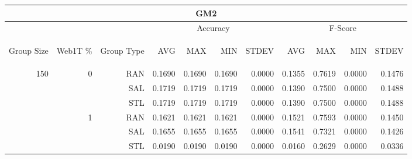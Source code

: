 \begin{center}
\begin{table}[htbp]
\begin{tabular}{ | r | r | r | r | r | r | r | r | r | r | r |}
\hline
\multicolumn{11}{|c|}{GM2}\\
\hline
 & & & \multicolumn{4}{|c|}{Accuracy} & \multicolumn{4}{|c|}{F-Score}\\ \cline{4-11}
\begin{sideways}Group Size\end{sideways} & \begin{sideways}Web1T \%\end{sideways} & \begin{sideways}Group Type\end{sideways} & \begin{sideways}AVG\end{sideways} & \begin{sideways}MAX\end{sideways} & \begin{sideways}MIN\end{sideways} & \begin{sideways}STDEV\end{sideways} & \begin{sideways}AVG\end{sideways} & \begin{sideways}MAX\end{sideways} & \begin{sideways}MIN\end{sideways} & \begin{sideways}STDEV\end{sideways}\\
\hline
\multirow{18}{*}{150}
 & \multirow{3}{*}{0} & RAN & 0.1690 & 0.1690 & 0.1690 & 0.0000 & 0.1355 & 0.7619 & 0.0000 & 0.1476\\ \cline{3-11}
 &   & SAL & 0.1719 & 0.1719 & 0.1719 & 0.0000 & 0.1390 & 0.7500 & 0.0000 & 0.1488\\ \cline{3-11}
 &   & STL & 0.1719 & 0.1719 & 0.1719 & 0.0000 & 0.1390 & 0.7500 & 0.0000 & 0.1488\\ \cline{2-11}
 & \multirow{3}{*}{1} & RAN & 0.1621 & 0.1621 & 0.1621 & 0.0000 & 0.1521 & 0.7593 & 0.0000 & 0.1450\\ \cline{3-11}
 &   & SAL & 0.1655 & 0.1655 & 0.1655 & 0.0000 & 0.1541 & 0.7321 & 0.0000 & 0.1426\\ \cline{3-11}
 &   & STL & 0.0190 & 0.0190 & 0.0190 & 0.0000 & 0.0160 & 0.2629 & 0.0000 & 0.0336\\ \cline{2-11}

\end{tabular}
\end{table}
\end{center}
